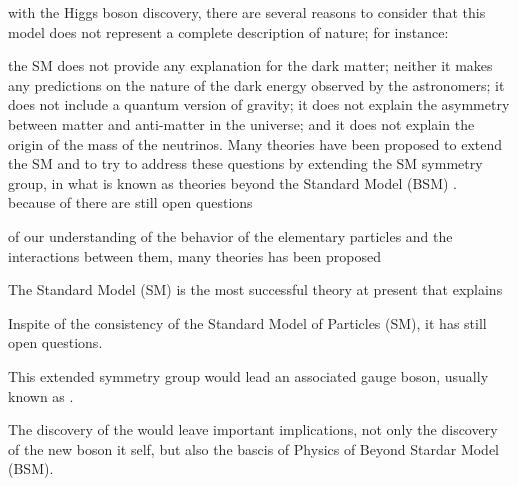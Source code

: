 with the Higgs boson discovery, there are several
reasons to consider that this model does not represent a complete description of nature; for
instance: 

the SM does not provide any explanation for the dark matter; neither it makes any predictions
on the nature of the dark energy observed by the astronomers;
it does not include a quantum version of gravity; it does not explain the asymmetry between matter and anti-matter in the universe; and
it does not explain the origin of the mass of the neutrinos. Many theories have been proposed to extend the SM and to try to address these questions
by extending the SM symmetry group, in what is known as theories beyond the Standard Model (BSM) \cite{SMProblems}.\\



because of there are still open questions 


of our understanding of the behavior of the elementary particles
and the interactions between them, many theories has been proposed 

The Standard Model (SM) is the most successful theory at present
that explains 


Inspite of the consistency of the Standard Model of Particles (SM), it has still open questions. 



This extended symmetry group would lead an associated gauge boson, usually known as 
\Zprime. 

The discovery of the \Zprime would leave important implications, not only the discovery of the new boson it self,
but also the bascis of Physics of Beyond Stardar Model (BSM). 

